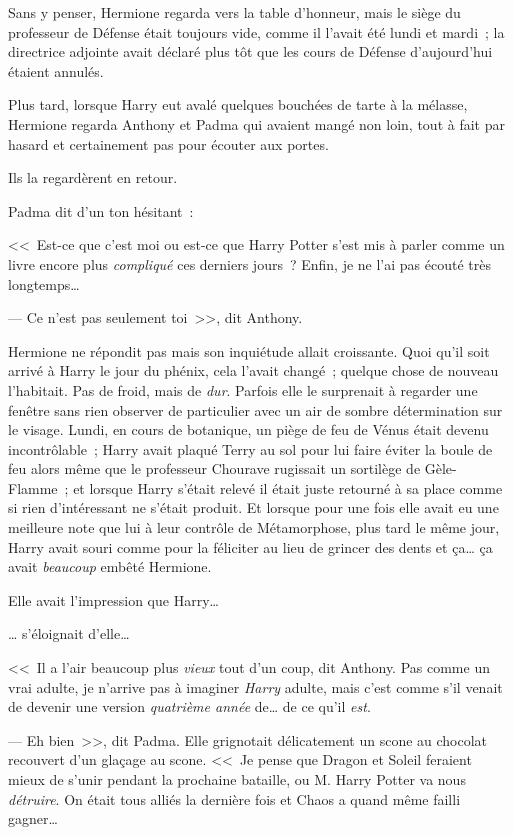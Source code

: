 Sans y penser, Hermione regarda vers la table d'honneur, mais le siège du professeur de Défense était toujours vide, comme il l'avait été lundi et mardi~; la directrice adjointe avait déclaré plus tôt que les cours de Défense d'aujourd'hui étaient annulés.

Plus tard, lorsque Harry eut avalé quelques bouchées de tarte à la mélasse, Hermione regarda Anthony et Padma qui avaient mangé non loin, tout à fait par hasard et certainement pas pour écouter aux portes.

Ils la regardèrent en retour.

Padma dit d'un ton hésitant~:

<<~Est-ce que c'est moi ou est-ce que Harry Potter s'est mis à parler comme un livre encore plus \emph{compliqué} ces derniers jours~? Enfin, je ne l'ai pas écouté très longtemps…

--- Ce n'est pas seulement toi~>>, dit Anthony.

Hermione ne répondit pas mais son inquiétude allait croissante. Quoi qu'il soit arrivé à Harry le jour du phénix, cela l'avait changé~; quelque chose de nouveau l'habitait. Pas de froid, mais de \emph{dur}. Parfois elle le surprenait à regarder une fenêtre sans rien observer de particulier avec un air de sombre détermination sur le visage. Lundi, en cours de botanique, un piège de feu de Vénus était devenu incontrôlable~; Harry avait plaqué Terry au sol pour lui faire éviter la boule de feu alors même que le professeur Chourave rugissait un sortilège de Gèle-Flamme~; et lorsque Harry s'était relevé il était juste retourné à sa place comme si rien d'intéressant ne s'était produit. Et lorsque pour une fois elle avait eu une meilleure note que lui à leur contrôle de Métamorphose, plus tard le même jour, Harry avait souri comme pour la féliciter au lieu de grincer des dents et ça… ça avait \emph{beaucoup} embêté Hermione.

Elle avait l'impression que Harry…

… s'éloignait d'elle…

<<~Il a l'air beaucoup plus \emph{vieux} tout d'un coup, dit Anthony. Pas comme un vrai adulte, je n'arrive pas à imaginer \emph{Harry} adulte, mais c'est comme s'il venait de devenir une version \emph{quatrième année} de… de ce qu'il \emph{est}.

--- Eh bien~>>, dit Padma. Elle grignotait délicatement un scone au chocolat recouvert d'un glaçage au scone. <<~Je pense que Dragon et Soleil feraient mieux de s'unir pendant la prochaine bataille, ou M. Harry Potter va nous \emph{détruire}. On était tous alliés la dernière fois et Chaos a quand même failli gagner…

